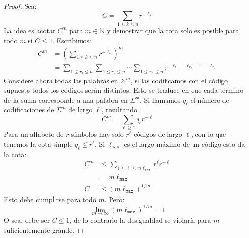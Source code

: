 \begin{proof}
    Sea:
    \begin{equation*}
      C
        = \sum_{1 \le k \le n} r^{-\ell_k}
    \end{equation*}
    La idea es acotar \(C^m\) para \(m \in \mathbb{N}\)
    y demostrar que la cota solo es posible para todo \(m\) si \(C \le 1\).
    Escribimos:
    \begin{align*}
      C^m
        &= \left( \sum_{1 \le k \le n} r^{-\ell_k} \right)^m \\
        &= \sum_{1 \le r_1 \le n}
             \sum_{1 \le r_2 \le n} \cdots \sum_{1 \le r_n \le n}
               r^{-\ell_{r_1} - \ell_{r_2} - \dotsm - \ell_{r_n}}
    \end{align*}
    Considere ahora todas las palabras en \(\Sigma^m\),
    si las codificamos con el código supuesto todos los códigos serán distintos.
    Esto se traduce en que cada término de la suma
    corresponde a una palabra en \(\Sigma^m\).
    Si llamamos \(q_\ell\)
    el número de codificaciones de \(\Sigma^m\) de largo \(\ell\),
    resultando:
    \begin{equation*}
      C^m
        = \sum_{\ell \ge 1} q_\ell r^{-\ell}
    \end{equation*}
    Para un alfabeto de \(r\) símbolos
    hay solo \(r^\ell\) códigos de largo \(\ell\),
    con lo que tenemos la cota simple \(q_\ell \le r^\ell\).
    Si \(\ell_{\mathtt{max}}\)
    es el largo máximo de un código
    esto da la cota:
    \begin{align*}
      C^m
        &\le \sum_{1 \le \ell \le m \ell_{\mathtt{max}}} r^{\ell} r^{-\ell} \\
        &=   m \ell_{\mathtt{max}} \\
      C
        &\le \left( m \ell_{\mathtt{max}} \right)^{1 / m}
    \end{align*}
    Esto debe cumpĺirse para todo \(m\).
    Pero:
    \begin{equation*}
      \lim_{m \to \infty} \left( m \ell_{\mathtt{max}} \right)^{1 / m}
        = 1
    \end{equation*}
    O sea,
    debe ser \(C \le 1\),
    de lo contrario la desigualdad
    se violaría para \(m\) suficientemente grande.
  \end{proof}


